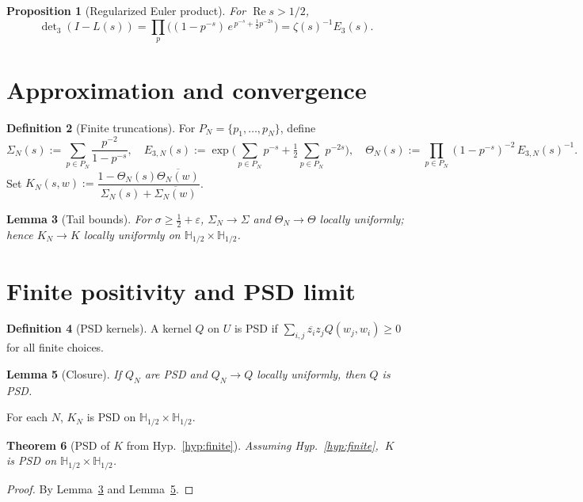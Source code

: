 \documentclass[11pt]{article}
\newcommand{\ReS}{\operatorname{Re}}
\newcommand{\Si}{\Sigma}
\newcommand{\SiN}{\Sigma_N}
\newcommand{\Th}{\Theta}
\newcommand{\ThN}{\Theta_N}
\newcommand{\kN}{K_N}
\newcommand{\detm}[1]{\det\nolimits_{#1}}
\theoremstyle{plain}
\newtheorem{theorem}{Theorem}
\newtheorem{lemma}[theorem]{Lemma}
\newtheorem{proposition}[theorem]{Proposition}
\theoremstyle{definition}
\newtheorem{definition}[theorem]{Definition}
\theoremstyle{remark}
\begin{document}
\begin{proposition}[Regularized Euler product]\label{prop:det3}
For $\ReS s>1/2$,
\[
\detm{3}(I-L(s))=\prod_{p}\Big((1-p^{-s})\,e^{\,p^{-s}+\tfrac12 p^{-2s}}\Big)=\zeta(s)^{-1}E_3(s).
\]
\end{proposition}

\section{Approximation and convergence}
\begin{definition}[Finite truncations]
For $P_N=\{p_1,\dots,p_N\}$, define
\[
\SiN(s):=\sum_{p\in P_N}\frac{p^{-2}}{1-p^{-s}},\quad
E_{3,N}(s):=\exp\Big(\sum_{p\in P_N}p^{-s}+\tfrac12\sum_{p\in P_N}p^{-2s}\Big),\quad
\ThN(s):=\prod_{p\in P_N}(1-p^{-s})^{-2}\,E_{3,N}(s)^{-1}.
\]
Set $\kN(s,w):=\dfrac{1-\ThN(s)\overline{\ThN(w)}}{\SiN(s)+\overline{\SiN(w)}}$.
\end{definition}

\begin{lemma}[Tail bounds]\label{lem:tails}
For $\sigma\ge \tfrac12+\varepsilon$, $\SiN\to \Si$ and $\ThN\to \Th$ locally uniformly; hence $\kN\to K$ locally uniformly on $\mathbb{H}_{1/2}\times\mathbb{H}_{1/2}$.
\end{lemma}

\section{Finite positivity and PSD limit}
\begin{definition}[PSD kernels]
A kernel $Q$ on $U$ is PSD if $\sum_{i,j}\overline{z_i}z_j Q(w_j,w_i)\ge 0$ for all finite choices.
\end{definition}

\begin{lemma}[Closure]\label{lem:psd-closed}
If $Q_N$ are PSD and $Q_N\to Q$ locally uniformly, then $Q$ is PSD.
\end{lemma}

\begin{hypothesis}\label{hyp:finite}
For each $N$, $\kN$ is PSD on $\mathbb{H}_{1/2}\times\mathbb{H}_{1/2}$.
\end{hypothesis}

\begin{theorem}[PSD of $K$ from Hyp.~\ref{hyp:finite}]\label{thm:limit-psd}
Assuming Hyp.~\ref{hyp:finite}, $\ K$ is PSD on $\mathbb{H}_{1/2}\times\mathbb{H}_{1/2}$.
\end{theorem}
\begin{proof}
By Lemma~\ref{lem:tails} and Lemma~\ref{lem:psd-closed}.
\end{proof}
\end{document}
